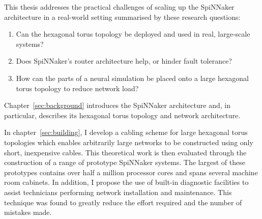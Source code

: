 %

This thesis addresses the practical challenges of scaling up the SpiNNaker
architecture in a real-world setting summarised by these research questions:

\begin{enumerate}
	
	\item Can the hexagonal torus topology be deployed and used in real,
	large-scale systems?
	
	\item Does SpiNNaker's router architecture help, or hinder fault tolerance?
	
	\item How can the parts of a neural simulation be placed onto a large
	hexagonal torus topology to reduce network load?
	
\end{enumerate}

%

Chapter~\ref{sec:background} introduces the SpiNNaker architecture and, in
particular, describes its hexagonal torus topology and network architecture.

In chapter~\ref{sec:building}, I develop a cabling scheme for large hexagonal
torus topologies which enables arbitrarily large networks to be constructed
using only short, inexpensive cables. This theoretical work is then evaluated
through the construction of a range of prototype SpiNNaker systems. The largest
of these prototypes contains over half a million processor cores and spans
several machine room cabinets. In addition, I propose the use of built-in
diagnostic facilities to assist technicians performing network installation and
maintenance. This technique was found to greatly reduce the effort required and
the number of mistakes made.

